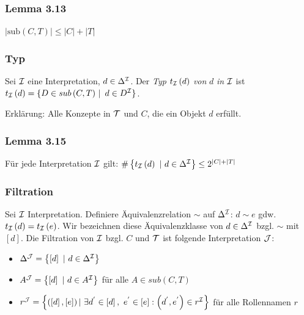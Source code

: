 \hypertarget{lemma-3.13}{\subsubsection{Lemma 3.13}\label{lemma-3.13}}

$\left| \text{sub}\left( C,T \right) \right| \leq \left| C \right| + \left| T \right|$

\subsubsection{Typ}\label{typ}

Sei $\mathcal{I}$ eine Interpretation, $d \in \Delta^{\mathcal{I}}$. Der \emph{Typ}
$t_{\mathcal{I}}\left( d \right)$ \emph{von} $d$ \emph{in} $\mathcal{I}$ ist
$t_{\mathcal{I}}\left( d \right) = \left\{ D \in sub\left( C,T \right)\  \right|\ d \in D^{\mathcal{I}}\}$.

Erklärung: Alle Konzepte in $\mathcal{T}$ und $C$, die ein Objekt $d$
erfüllt.

\hypertarget{lemma-3.15}{\subsubsection{Lemma 3.15}\label{lemma-3.15}}

Für jede Interpretation $\mathcal{I}$ gilt:
$\#\left\{ t_{\mathcal{I}}\left( d \right)\ |\ d \in \Delta^{\mathcal{I}} \right\} \leq 2^{\left| C \right| + |T|}$

\subsubsection{Filtration}\label{filtration}

Sei $\mathcal{I}$ Interpretation. Definiere Äquivalenzrelation $\sim$ auf
$\Delta^{\mathcal{I}}$: $d \sim e$ gdw.
$t_{\mathcal{I}}\left( d \right) = t_{\mathcal{I}}\left( e \right)$. Wir bezeichnen diese
Äquivalenzklasse von $d \in \Delta^{\mathcal{I}}$ bzgl. $\sim$ mit
$\left\lbrack d \right\rbrack$. Die Filtration von $\mathcal{I}$ bzgl. $C$
und $\mathcal{T}$ ist folgende Interpretation $\mathcal{J}$:

\begin{itemize}
\item
  $\Delta^{\mathcal{J}} = \left\{ \left\lbrack d \right\rbrack\ |\ d \in \Delta^{\mathcal{I}} \right\}$
\item
  $A^{\mathcal{J}} = \left\{ \left\lbrack d \right\rbrack\ |\ d \in A^{\mathcal{I}} \right\}$
  für alle $A \in sub\left( C,T \right)$
\item
  $r^{\mathcal{J}} = \left\{ \left( \left\lbrack d \right\rbrack,\left\lbrack e \right\rbrack \right)|\ \exists d^{'} \in \left\lbrack d \right\rbrack,\ e^{'} \in \left\lbrack e \right\rbrack:\left( d^{'},e^{'} \right) \in r^{\mathcal{I}} \right\}$
  für alle Rollennamen $r$
\end{itemize}

